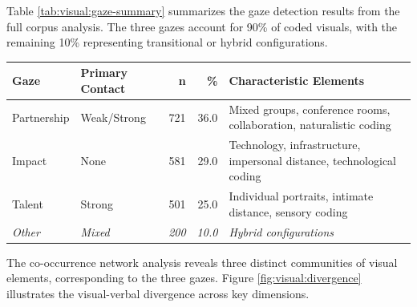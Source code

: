 \documentclass[../main.tex]{subfiles}
\begin{document}
Table \ref{tab:visual:gaze-summary} summarizes the gaze detection results from the full corpus analysis. The three gazes account for 90\% of coded visuals, with the remaining 10\% representing transitional or hybrid configurations.

\begin{center}
\small
\begin{tabular}{llrrp{5cm}}
\toprule
\textbf{Gaze} & \textbf{Primary Contact} & \textbf{n} & \textbf{\%} & \textbf{Characteristic Elements} \\
\midrule
Partnership & Weak/Strong & 721 & 36.0 & Mixed groups, conference rooms, collaboration, naturalistic coding \\
Impact & None & 581 & 29.0 & Technology, infrastructure, impersonal distance, technological coding \\
Talent & Strong & 501 & 25.0 & Individual portraits, intimate distance, sensory coding \\
\textit{Other} & \textit{Mixed} & \textit{200} & \textit{10.0} & \textit{Hybrid configurations} \\
\bottomrule
\end{tabular}
\end{center}

The co-occurrence network analysis reveals three distinct communities of visual elements, corresponding to the three gazes. Figure \ref{fig:visual:divergence} illustrates the visual-verbal divergence across key dimensions.

\begin{center}
\end{center}
\end{document}
